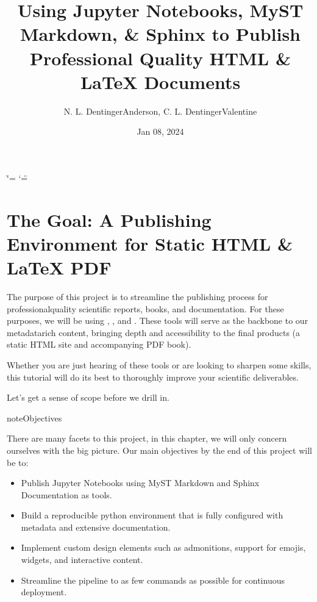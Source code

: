 \documentclass[letterpaper,12pt,english]{sphinxmanual}
\title{Using Jupyter Notebooks, MyST Markdown, \& Sphinx to Publish Professional Quality HTML \& LaTeX Documents}
\date{Jan 08, 2024}
\author{N.\@{} L.\@{} Dentinger\sphinxhyphen{}Anderson, C.\@{} L.\@{} Dentinger\sphinxhyphen{}Valentine}
\begin{document}
\ifdefined\shorthandoff
  \ifnum\catcode`\=\string=\active\shorthandoff{=}\fi
  \ifnum\catcode`\"=\active{}\fi
\fi

\pagestyle{empty}
\sphinxmaketitle
\pagestyle{plain}
\sphinxtableofcontents
\pagestyle{normal}
\label{\detokenize{index::doc}}


\sphinxstepscope


\chapter{The Goal: A Publishing Environment for Static HTML \& LaTeX PDF}
\label{\detokenize{_notebooks/00-the-goal:the-goal-a-publishing-environment-for-static-html-latex-pdf}}\label{\detokenize{_notebooks/00-the-goal::doc}}
\sphinxAtStartPar
The purpose of this project is to streamline the publishing process for professional\sphinxhyphen{}quality scientific reports, books, and documentation. For these purposes, we will be using , , and . These tools will serve as the backbone to our metadata\sphinxhyphen{}rich content, bringing depth and accessibility to the final products (a static HTML site and accompanying PDF book).

\sphinxAtStartPar
Whether you are just hearing of these tools or are looking to sharpen some skills, this tutorial will do its best to thoroughly improve your scientific deliverables.

\sphinxAtStartPar
Let’s get a sense of scope before we drill in.

\begin{sphinxadmonition}{note}{Objectives}

\sphinxAtStartPar
There are many facets to this project, in this chapter, we will only concern ourselves with the big picture. Our main objectives by the end of this project will be to:
\begin{itemize}
\item {} 
\sphinxAtStartPar
Publish Jupyter Notebooks using MyST Markdown and Sphinx Documentation as tools.

\item {} 
\sphinxAtStartPar
Build a reproducible python environment that is fully configured with metadata and extensive documentation.

\item {} 
\sphinxAtStartPar
Implement custom design elements such as admonitions, support for emojis, widgets, and interactive content.

\item {} 
\sphinxAtStartPar
Streamline the pipeline to as few commands as possible for continuous deployment.

\end{itemize}
\end{sphinxadmonition}
\end{document}
